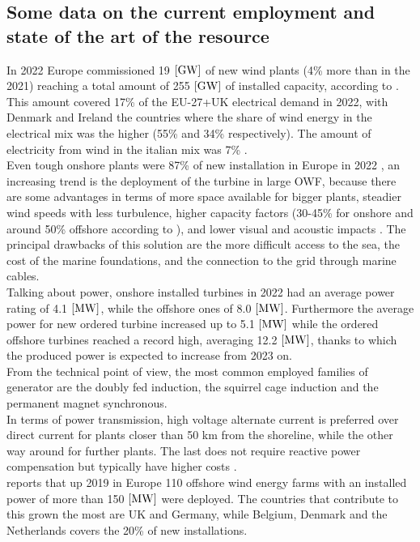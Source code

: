 \subsection{Some data on the current employment and state of the art of the resource}
In 2022 Europe commissioned 19 $\left[\si{\giga\watt}\right]$ of new wind plants (4\% more than in the 2021) reaching a total amount of 255 $\left[\si{\giga\watt}\right]$ of installed capacity, according to \cite{wind_europe_data_2022}. This amount covered 17\% of the EU-27+UK electrical demand in 2022, with Denmark and Ireland the countries where the share of wind energy in the electrical mix was the higher (55\% and 34\% respectively). The amount of electricity from wind in the italian mix was 7\% \cite{wind_europe_data_2022}.\\
Even tough onshore plants were 87\% of new installation in Europe in 2022 \cite{wind_europe_data_2022}, an increasing trend is the deployment of the turbine in large \acrfull{OWF}, because there are some advantages in terms of more space available for bigger plants, steadier wind speeds with less turbulence, higher capacity factors (30-45\% for onshore and around 50\% offshore according to \cite{wind_europe_data_2022}), and lower visual and acoustic impacts \cite{current_staus_and_future_trends_of_offshore_wind_power_in_europe}. The principal drawbacks of this solution are the more difficult access to the sea, the cost of the marine foundations, and the connection to the grid through marine cables.  \\
Talking about power, onshore installed turbines in 2022 had an average power rating of 4.1 $\left[\si{\mega\watt}\right]$, while the offshore ones of 8.0 $\left[\si{\mega\watt}\right]$. Furthermore the average power for new ordered turbine increased up to 5.1 $\left[\si{\mega\watt}\right]$ while the ordered offshore turbines reached a record high, averaging 12.2 $\left[\si{\mega\watt}\right]$, thanks to which the produced power is expected to increase from 2023 on.\\

From the technical point of view, the most common employed families of generator are the doubly fed induction, the squirrel cage induction and the permanent magnet synchronous.\\
In terms of power transmission, high voltage alternate current is preferred over direct current for plants closer than 50 km from the shoreline, while the other way around for further plants. The last does not require reactive power compensation but typically have higher costs \cite{current_staus_and_future_trends_of_offshore_wind_power_in_europe}.\\
\cite{current_staus_and_future_trends_of_offshore_wind_power_in_europe} reports that up 2019 in Europe 110 offshore wind energy farms with an installed power of more than 150 $\left[\si{\mega\watt}\right]$ were deployed. The countries that contribute to this grown the most are UK and Germany, while Belgium, Denmark and the Netherlands covers the 20\% of new installations.

